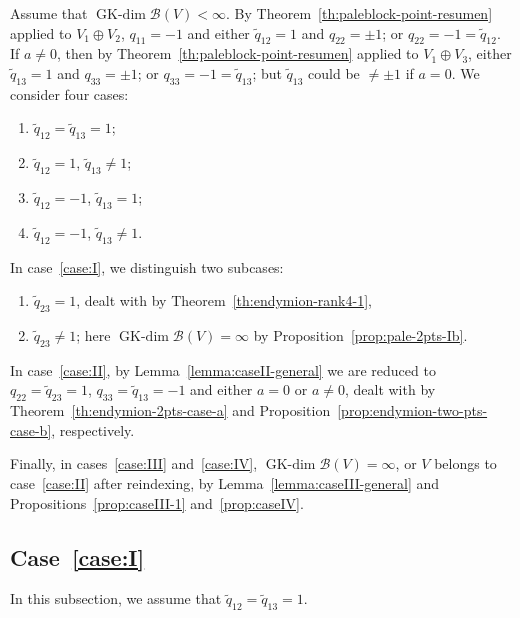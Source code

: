 \documentclass[pdftex]{sigma}
\numberwithin{equation}{section}
\newcommand{\GK}{\operatorname{GK-dim}}
\newcommand{\toba}{\mathscr B}
\begin{document}
Assume that $\GK \toba(V) < \infty$.
By Theorem~\ref{th:paleblock-point-resumen} applied to $V_1 \oplus V_2$, $q_{11} = -1$ and
either $\widetilde{q}_{12} = 1$ and $q_{22} = \pm 1$; or $q_{22} = -1 = \widetilde{q}_{12}$.
If $a\neq 0$, then by Theorem~\ref{th:paleblock-point-resumen} applied to $V_1 \oplus V_3$, either
$\widetilde{q}_{13} = 1$ and $q_{33} = \pm 1$; or $q_{33} = -1 = \widetilde{q}_{13}$;
but $\widetilde{q}_{13}$ could be $\neq \pm 1$ if $a = 0$.
We consider four cases:
\begin{enumerate}[label=(\rm{\Roman*)}]
\item\label{case:I} $\widetilde{q}_{12}= \widetilde{q}_{13}=1$;

\item\label{case:II} $\widetilde{q}_{12}=1$, $\widetilde{q}_{13} \neq 1$;

\item\label{case:III} $\widetilde{q}_{12}=-1$, $\widetilde{q}_{13}=1$;

\item\label{case:IV} $\widetilde{q}_{12}=-1$, $\widetilde{q}_{13} \neq 1$.
\end{enumerate}

In case~\ref{case:I}, we distinguish two subcases:{\samepage
\begin{enumerate}[label=$(\alph*)$]\itemsep=0pt
\item\label{case:Ia} $\widetilde{q}_{23}=1$, dealt with by Theorem~\ref{th:endymion-rank4-1},

\item\label{case:Ib} $\widetilde{q}_{23} \neq 1$; here $\GK \toba(V) = \infty$ by Proposition~\ref{prop:pale-2pts-Ib}.
\end{enumerate}}

In case~\ref{case:II}, by Lemma~\ref{lemma:caseII-general} we are reduced to
$q_{22} = \widetilde{q}_{23} = 1$, $q_{33} = \widetilde{q}_{13} = -1$ and
either $a = 0$ or
$a \neq 0$, dealt with by Theorem~\ref{th:endymion-2pts-case-a} and Proposition~\ref{prop:endymion-two-pts-case-b},
respectively.

Finally, in cases~\ref{case:III} and~\ref{case:IV}, $\GK \toba(V) = \infty$, or $V$ belongs to case~\ref{case:II} after reindexing,
by Lemma~\ref{lemma:caseIII-general} and
Propositions~\ref{prop:caseIII-1} and~\ref{prop:caseIV}.

\subsection[Case~(I)]{Case~\ref{case:I}}
In this subsection, we assume that $\widetilde{q}_{12}= \widetilde{q}_{13}=1$.
\end{document}
